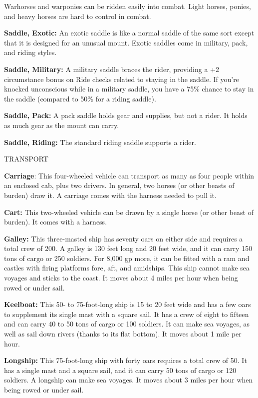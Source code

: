\documentclass{article}
\begin{document}
Warhorses and warponies can be ridden easily into combat. Light horses, ponies, 
and heavy horses are hard to control in combat.

\textbf{Saddle, Exotic:} An exotic saddle is like a normal saddle of the same sort 
except that it is designed for an unusual mount. Exotic saddles come in military, 
pack, and riding styles.

\textbf{Saddle, Military:} A military saddle braces the rider, providing a +2 circumstance 
bonus on Ride checks related to staying in the saddle. If you're knocked unconscious 
while in a military saddle, you have a 75\% chance to stay in the saddle (compared 
to 50\% for a riding saddle).

\textbf{Saddle, Pack:} A pack saddle holds gear and supplies, but not a rider. 
It holds as much gear as the mount can carry.

\textbf{Saddle, Riding:} The standard riding saddle supports a rider.

\vspace{12pt}
TRANSPORT

\textbf{Carriage}: This four-wheeled vehicle can transport as many as four people 
within an enclosed cab, plus two drivers. In general, two horses (or other beasts 
of burden) draw it. A carriage comes with the harness needed to pull it.

\textbf{Cart:} This two-wheeled vehicle can be drawn by a single horse (or other 
beast of burden). It comes with a harness.

\textbf{Galley:} This three-masted ship has seventy oars on either side and requires 
a total crew of 200. A galley is 130 feet long and 20 feet wide, and it can carry 
150 tons of cargo or 250 soldiers. For 8,000 gp more, it can be fitted with a ram 
and castles with firing platforms fore, aft, and amidships. This ship cannot make 
sea voyages and sticks to the coast. It moves about 4 miles per hour when being 
rowed or under sail.

\textbf{Keelboat:} This 50- to 75-foot-long ship is 15 to 20 feet wide and has 
a few oars to supplement its single mast with a square sail. It has a crew of eight 
to fifteen and can carry 40 to 50 tons of cargo or 100 soldiers. It can make sea 
voyages, as well as sail down rivers (thanks to its flat bottom). It moves about 
1 mile per hour.

\textbf{Longship:} This 75-foot-long ship with forty oars requires a total crew 
of 50. It has a single mast and a square sail, and it can carry 50 tons of cargo 
or 120 soldiers. A longship can make sea voyages. It moves about 3 miles per hour 
when being rowed or under sail.
\end{document}
